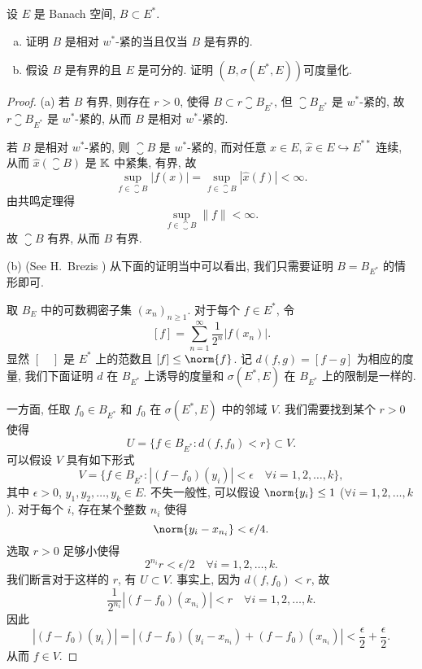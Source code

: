 \begin{exercise}
  设 $E$ 是 Banach 空间, $B\subset E^*$.
  \begin{enumerate}[(a)]
    \item 证明 $B$ 是相对 $w^*$-紧的当且仅当 $B$ 是有界的.
    \item 假设 $B$ 是有界的且 $E$ 是可分的. 证明 $(B, \sigma(E^*,E))$可度量化. 
  \end{enumerate}
\end{exercise}

\begin{proof}
    (a) \sufficient 若 $B$ 有界, 则存在 $r>0$, 使得 $B\subset r\closure{B}_{E^*}$,
    但 $\closure{B}_{E^*}$ 是 $w^*$-紧的, 故 $r\closure{B}_{E^*}$ 是 $w^*$-紧的,
    从而 $B$ 是相对 $w^*$-紧的.

    \necessary
    若 $B$ 是相对 $w^*$-紧的, 则 $\closure{B}$ 是 $w^*$-紧的,
    而对任意 $x\in E$, $\hat{x}\in E\hookrightarrow E^{**}$ 连续,
    从而 $\hat{x}(\closure{B})$ 是 $\mathbb{K}$ 中紧集, 有界, 故
    \[\sup_{f\in\closure{B}}|f(x)|=\sup_{f\in\closure{B}}|\hat{x}(f)|<\infty.\]
    由共鸣定理得
    \[\sup_{f\in\closure{B}}\|f\|<\infty.\]
    故 $\closure{B}$ 有界, 从而 $B$ 有界.

    (b) (See H.~Brezis \cite[Theorem 3.28]{brezis_functional_2011})
    从下面的证明当中可以看出, 我们只需要证明 $B=B_{E^*}$ 的情形即可.

    取 $B_E$ 中的可数稠密子集 $(x_n)_{n\geq 1}$. 对于每个 $f\in E^*$, 令
    \[[f] = \sum_{n=1}^{\infty} \frac{1}{2^n} |f(x_n)|.\]
    显然 $[\quad]$ 是 $E^*$ 上的范数且 $[f]\leq\norm{f}$.
    记 $d(f,g) = [f-g]$ 为相应的度量, 我们下面证明 $d$ 在 $B_{E^*}$
    上诱导的度量和 $\sigma(E^*,E)$ 在 $B_{E^*}$ 上的限制是一样的.

    一方面, 任取 $f_0\in B_{E^*}$ 和 $f_0$ 在 $\sigma(E^*,E)$ 中的邻域 $V$.
    我们需要找到某个 $r>0$ 使得
    \[U = \{f\in B_{E^*}\colon d(f, f_0) < r\} \subset V.\]
    可以假设 $V$ 具有如下形式
    \[V = \{f\in B_{E^*}\colon |(f-f_0)(y_i)|<\epsilon
      \quad \forall i=1,2,\ldots,k\},\]
    其中 $\epsilon>0$, $y_1,y_2,\ldots,y_k\in E$.
    不失一般性, 可以假设 $\norm{y_i}\leq 1$ ($\forall i=1,2,\ldots,k$).
    对于每个 $i$, 存在某个整数 $n_i$ 使得
    \[\norm{y_i - x_{n_i}} < \epsilon/4.\]
    选取 $r>0$ 足够小使得
    \[2^{n_i}r < \epsilon/2\quad\forall i=1,2,\ldots,k.\]
    我们断言对于这样的 $r$, 有 $U\subset V$. 事实上, 因为 $d(f,f_0)<r$, 故
    \[\frac{1}{2^{n_i}}|(f-f_0)(x_{n_i})| < r\quad\forall i=1,2,\dots,k.\]
    因此
    \[|(f-f_0)(y_i)| = |(f-f_0)(y_i-x_{n_i}) + (f-f_0)(x_{n_i})|
      < \frac{\epsilon}{2} + \frac{\epsilon}{2}.\]
    从而 $f\in V$.


\end{proof}
